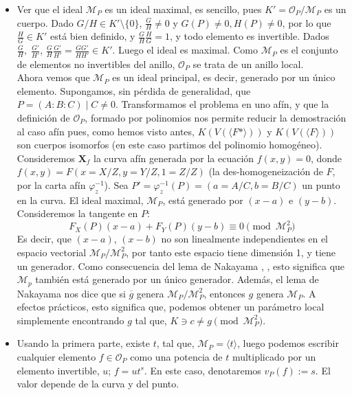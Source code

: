\documentclass[11pt,spanish]{book}
\begin{document}
\begin{itemize}
    \item  Ver que el ideal $\mathcal{M}_P$ es un ideal maximal, es sencillo, pues $K'=\mathcal{O}_P/\mathcal{M}_P$ es un cuerpo. Dado $G/H\in K'\setminus \{0\}$, $\frac{G}{H}\neq 0$ y $G(P)\neq 0, H(P)\neq 0$, por lo que $\frac{H}{G}\in K'$ está bien definido, y $\frac{G}{H}\frac{H}{G}=1$, y todo elemento es invertible. Dados $\frac{G}{H},\;\frac{G'}{H'}$, $\frac{G}{H}\frac{G'}{H'}=\frac{GG'}{HH'}\in K'$. Luego el ideal es maximal. Como $\mathcal{M}_P$ es el conjunto de elementos no invertibles del anillo, $\mathcal{O}_P$ se trata de un anillo local.\\
    Ahora vemos que $\mathcal{M}_{P}$ es un ideal principal, es decir, generado por un único elemento. Supongamos, sin pérdida de generalidad, que $P=(A:B:C)\;|\; C\neq 0$. Transformamos el problema en uno afín, y que la definición de $\mathcal{O}_P$, formado por polinomios nos permite reducir la demostración al caso afín pues, como hemos visto antes, $K(V(\langle F* \rangle))$ y $K(V(\langle F \rangle))$ son cuerpos isomorfos (en este caso partimos del polinomio homogéneo). Consideremos $\mathbf{X}_{f}$ la curva afín generada por la ecuación $f(x,y)=0$, donde $f(x,y)=F(x=X/Z,y=Y/Z,1=Z/Z)$ (la des-homogeneización de $F$, por la carta afín $\varphi_z^{-1}$). Sea $P'=\varphi_z^{-1}(P)=(a=A/C,b=B/C )$ un punto en la curva. El ideal maximal, $\mathcal{M}_P$, está generado por $(x-a)$ e $(y-b)$. Consideremos la tangente en $P$: 
    $$F_{X}(P)(x - a) + F_Y (P)(y - b) \equiv 0\pmod {\mathcal{M}_P^2}$$
    Es decir, que $(x-a)$, $(x-b)$ no son linealmente independientes en el espacio vectorial $\mathcal{M}_{P}/\mathcal{M}_P^2$, por tanto este espacio tiene dimensión 1, y tiene un generador. Como consecuencia del lema de Nakayama \cite{Commutative-Albegra}, \cite{FULTRON}, esto significa que $\mathcal{M}_p$ también está generado por un único generador. Además, el lema de Nakayama nos dice que si $\overline{g}$ genera $\mathcal{M}_{P}/\mathcal{M}_P^2$, entonces $g$ genera $\mathcal{M}_P$. A efectos prácticos, esto significa que, podemos obtener un parámetro local simplemente encontrando $g$ tal que, $K\ni c\neq g\pmod{\mathcal{M}^2_P}$.
    \item Usando la primera parte, existe $t$, tal que, $\mathcal{M}_P = \langle t \rangle$, luego podemos escribir cualquier elemento $f\in\mathcal{O}_P$ como una potencia de $t$ multiplicado por un elemento invertible, $u$; $f=ut^s$. En este caso, denotaremos $v_{P}(f):=s$. El valor depende de la curva y del punto.
\end{itemize}
\end{document}

